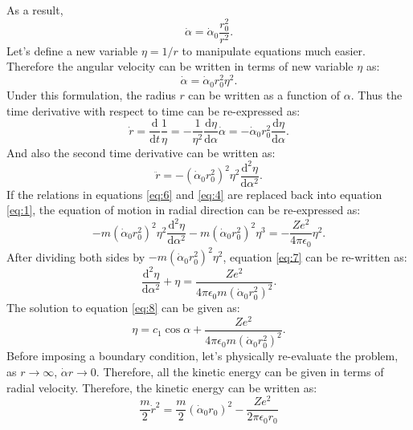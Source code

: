 \documentclass[11pt]{amsart}
\begin{document}
As a result,
\begin{equation}
\dot{\alpha}=\dot{\alpha}_0 \frac{r_{0}^2}{r^2}.
\end{equation}
Let's define a new variable $\eta = 1/r$ to manipulate equations much easier. Therefore the angular velocity can be written in terms of new variable $\eta$ as:
\begin{equation}
\label{eq:4}
\dot{\alpha}=\dot{\alpha}_0 r_{0}^2 \eta^2.
\end{equation}
Under this formulation, the radius $r$ can be written as a function of $\alpha$. Thus the time derivative with respect to time can be re-expressed as:
\begin{equation}
\label{eq:5}
\dot{r}=\frac{\mathrm{d}}{\mathrm{d}t}\frac{1}{\eta}=-\frac{1}{\eta^2}\frac{\mathrm{d} \eta}{\mathrm{d} \alpha}\dot{\alpha}=-\dot{\alpha}_0 r_{0}^2 \frac{\mathrm{d} \eta}{\mathrm{d} \alpha}.
\end{equation}
And also the second time derivative can be written as:
\begin{equation}
\label{eq:6}
\ddot{r}=-(\dot{\alpha}_0 r_{0}^2)^2 \eta^2\frac{\mathrm{d}^2 \eta}{\mathrm{d} \alpha^2}.
\end{equation}
If the relations in equations \ref{eq:6} and \ref{eq:4} are replaced back into equation \ref{eq:1}, the equation  of motion in radial direction can be re-expressed as:
\begin{equation}
\label{eq:7}
-m(\dot{\alpha}_0 r_{0}^2)^2 \eta^2\frac{\mathrm{d}^2 \eta}{\mathrm{d} \alpha^2}-m(\dot{\alpha}_0 r_{0}^2)^2 \eta^3=-\frac{Ze^2}{4 \pi \epsilon_0}\eta^2.
\end{equation}
After dividing both sides by $-m(\dot{\alpha}_0 r_{0}^2)^2 \eta^2$, equation \ref{eq:7} can be re-written as:
\begin{equation}
\label{eq:8}
\frac{\mathrm{d}^2 \eta}{\mathrm{d} \alpha^2}+\eta=\frac{Ze^2}{4 \pi \epsilon_0 m(\dot{\alpha}_0 r_{0}^2)^2}.
\end{equation}
The solution to equation \ref{eq:8} can be given as:
\begin{equation}
\label{eq:9}
\eta= c_1 \cos \alpha  +\frac{Ze^2}{4 \pi \epsilon_0 m(\dot{\alpha}_0 r_{0}^2)^2}.
\end{equation}
Before imposing a boundary condition, let's physically re-evaluate the problem, as $r\rightarrow \infty$, $\dot{\alpha}r \rightarrow 0$. Therefore, all the kinetic energy can be given in terms of radial velocity. Therefore, the kinetic energy can be written as:
\begin{equation}
\label{eq:10}
\frac{m}{2}\dot{r}^2=\frac{m}{2}(\dot{\alpha}_0 r_{0})^2 -\frac{Ze^2}{2 \pi \epsilon_0 r_{0}}
\end{equation}
\end{document}
